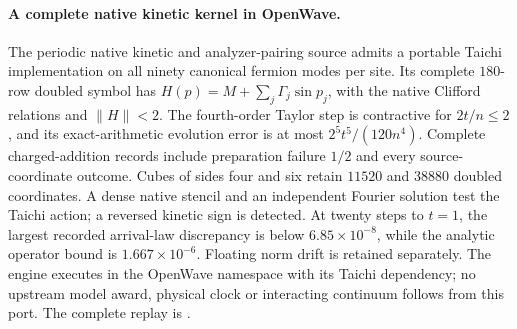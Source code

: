 \paragraph{A complete native kinetic kernel in OpenWave.}
The periodic native kinetic and analyzer-pairing source admits a portable
Taichi implementation on all ninety canonical fermion modes per site.
Its complete $180$-row doubled symbol has
$H(p)=M+\sum_j\Gamma_j\sin p_j$, with the native Clifford relations and
$\|H\|<2$. The fourth-order Taylor step is contractive for
$2t/n\leq2$, and its exact-arithmetic evolution error is at most
$2^5t^5/(120n^4)$. Complete charged-addition records include preparation
failure $1/2$ and every source-coordinate outcome. Cubes of sides four
and six retain $11520$ and $38880$ doubled coordinates. A dense native
stencil and an independent Fourier solution test the Taichi action;
a reversed kinetic sign is detected. At twenty steps to $t=1$,
the largest recorded arrival-law discrepancy is below
$6.85\times10^{-8}$, while the analytic operator bound is
$1.667\times10^{-6}$. Floating norm drift is retained separately.
The engine executes in the OpenWave namespace with its Taichi dependency;
no upstream model award, physical clock or interacting continuum follows
from this port. The complete replay is
.
